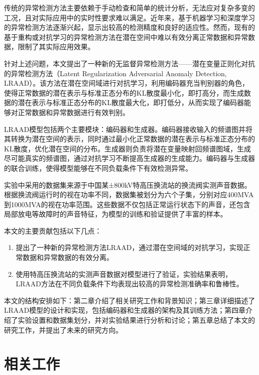 \documentclass{article}
\begin{document}
传统的异常检测方法主要依赖于手动检查和简单的统计分析，无法应对复杂多变的工况，且对实际应用中的实时性要求难以满足。近年来，基于机器学习和深度学习的异常检测方法逐渐兴起，显示出较高的检测精度和良好的适应性。然而，现有的基于重构或对抗学习的异常检测方法在潜在空间中难以有效分离正常数据和异常数据，限制了其实际应用效果。

针对上述问题，本文提出了一种新的无监督异常检测方法——潜在变量正则化对抗的异常检测方法（Latent Regularization Adversarial Anomaly Detection, LRAAD）。该方法在潜在空间域进行对抗学习，利用编码器充当判别器的角色，使得正常数据的潜在表示与标准正态分布的KL散度最小化，即打高分，而生成数据的潜在表示与标准正态分布的KL散度最大化，即打低分，从而实现了编码器能够对正常数据和异常数据进行有效判别。

LRAAD模型包括两个主要模块：编码器和生成器。编码器接收输入的频谱图并将其转换为潜在空间的表示，同时通过最小化正常数据的潜在表示与标准正态分布的KL散度，优化潜在空间的分布。生成器则负责将潜在变量映射回频谱图域，生成尽可能真实的频谱图，通过对抗学习不断提高生成器的生成能力。编码器与生成器的联合训练，使得模型能够在不同负载条件下有效检测异常。

实验中采用的数据集来源于中国某±800kV特高压换流站的换流阀实测声音数据。根据换流阀运行时的视在功率不同，数据集被划分为六个子集，分别对应400MVA到1000MVA的视在功率范围。这些数据不仅包括正常运行状态下的声音，还包含局部放电等故障时的声音特征，为模型的训练和验证提供了丰富的样本。

本文的主要贡献包括以下几点：

\begin{enumerate}

  \item 提出了一种新的异常检测方法LRAAD，通过潜在空间域的对抗学习，实现正常数据和异常数据的有效分离。

  \item 使用特高压换流站的实测声音数据对模型进行了验证，实验结果表明，LRAAD方法在不同负载条件下均表现出较高的异常检测准确率和鲁棒性。

\end{enumerate}

本文的结构安排如下：第二章介绍了相关研究工作和背景知识；第三章详细描述了LRAAD模型的设计和实现，包括编码器和生成器的架构及其训练方法；第四章介绍了实验设置和数据集划分，并对实验结果进行分析和讨论；第五章总结了本文的研究工作，并提出了未来的研究方向。

\section{相关工作}
\end{document}
